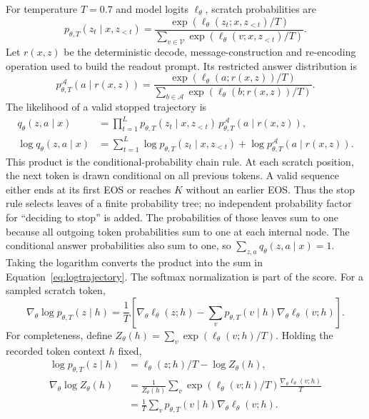 \documentclass[11pt]{article}
\begin{document}
For temperature $T=0.7$ and model logits $\ell_\theta$, scratch probabilities are
\begin{equation}
 p_{\theta,T}(z_t\mid x,z_{<t})=
 \frac{\exp(\ell_\theta(z_t;x,z_{<t})/T)}
      {\sum_{v\in\mathcal V}\exp(\ell_\theta(v;x,z_{<t})/T)}.
\end{equation}
Let $r(x,z)$ be the deterministic decode, message-construction and re-encoding operation used to build the readout prompt. Its restricted answer distribution is
\begin{equation}
 p^{\mathcal A}_{\theta,T}(a\mid r(x,z))=
 \frac{\exp(\ell_\theta(a;r(x,z))/T)}
      {\sum_{b\in\mathcal A}\exp(\ell_\theta(b;r(x,z))/T)}.
\end{equation}
The likelihood of a valid stopped trajectory is
\begin{align}
 q_\theta(z,a\mid x)&=
    \prod_{t=1}^{L}p_{\theta,T}(z_t\mid x,z_{<t})\,
                  p^{\mathcal A}_{\theta,T}(a\mid r(x,z)),\label{eq:trajectory}\\
 \log q_\theta(z,a\mid x)&=
   \sum_{t=1}^{L}\log p_{\theta,T}(z_t\mid x,z_{<t})
       +\log p^{\mathcal A}_{\theta,T}(a\mid r(x,z)).\label{eq:logtrajectory}
\end{align}
This product is the conditional-probability chain rule. At each scratch position, the next token is drawn conditional on all previous tokens. A valid sequence either ends at its first EOS or reaches $K$ without an earlier EOS. Thus the stop rule selects leaves of a finite probability tree; no independent probability factor for ``deciding to stop'' is added. The probabilities of those leaves sum to one because all outgoing token probabilities sum to one at each internal node. The conditional answer probabilities also sum to one, so $\sum_{z,a}q_\theta(z,a\mid x)=1$. Taking the logarithm converts the product into the sum in Equation~\eqref{eq:logtrajectory}.
The softmax normalization is part of the score. For a sampled scratch token,
\begin{equation}
 \nabla_\theta\log p_{\theta,T}(z\mid h)
 =\frac1T\left[\nabla_\theta\ell_\theta(z;h)
        -\sum_v p_{\theta,T}(v\mid h)\nabla_\theta\ell_\theta(v;h)\right].
\end{equation}
For completeness, define $Z_\theta(h)=\sum_v\exp(\ell_\theta(v;h)/T)$. Holding the recorded token context $h$ fixed,
\begin{align}
 \log p_{\theta,T}(z\mid h)&=\ell_\theta(z;h)/T-\log Z_\theta(h),\\
 \nabla_\theta\log Z_\theta(h)
 &=\frac{1}{Z_\theta(h)}\sum_v\exp(\ell_\theta(v;h)/T)
                                    \frac{\nabla_\theta\ell_\theta(v;h)}{T}\\
 &=\frac1T\sum_v p_{\theta,T}(v\mid h)\nabla_\theta\ell_\theta(v;h).
\end{align}
\end{document}
